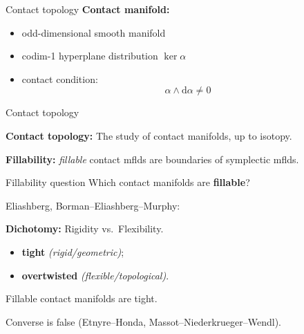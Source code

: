 \documentclass{beamer}
\begin{document}
\begin{frame}{Contact topology}
    \textbf{Contact manifold:}
    \begin{itemize}
        \item odd-dimensional smooth manifold
        \item codim-1 hyperplane distribution $\ker \alpha$
        \item contact condition: 
        \[ 
            \alpha \wedge \mathrm{d} \alpha \neq 0
        \]
    \end{itemize}
\end{frame}

\begin{frame}{Contact topology}

\textbf{Contact topology:} The study of contact manifolds, up to isotopy.

\medskip

\pause

\textbf{Fillability:} \emph{fillable} contact mflds are boundaries of symplectic mflds.

\pause

\begin{exampleblock}{Fillability question}  Which contact manifolds are \textbf{fillable}?
\end{exampleblock}

\pause

Eliashberg, Borman--Eliashberg--Murphy:

\begin{tcolorbox}
\textbf{Dichotomy:} Rigidity vs.\ Flexibility. 
\begin{itemize}
    \item \textbf{tight} \emph{(rigid/geometric)};
    \item  \textbf{overtwisted} \emph{(flexible/topological)}. 
\end{itemize}
\end{tcolorbox} 

\pause

\begin{theorem}
Fillable contact manifolds are tight.
\end{theorem}

Converse is false (Etnyre--Honda, Massot--Niederkrueger--Wendl).

\end{frame}
\end{document}
